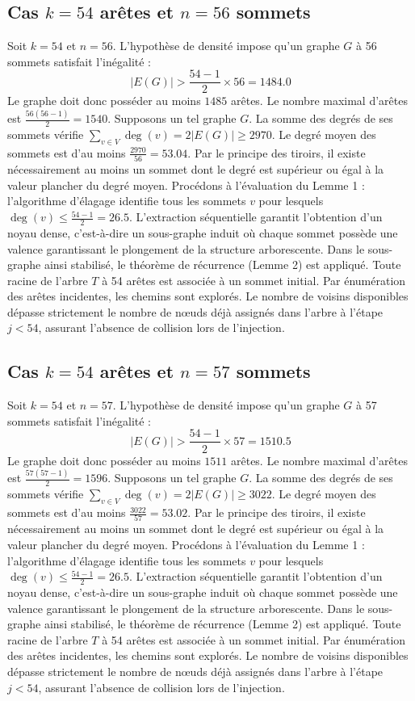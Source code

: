 \documentclass[12pt,a4paper]{article}
\begin{document}
\subsection{Cas $k = 54$ arêtes et $n = 56$ sommets}
Soit $k = 54$ et $n = 56$. L'hypothèse de densité impose qu'un graphe $G$ à 56 sommets satisfait l'inégalité :
$$ |E(G)| > \frac{54-1}{2} \times 56 = 1484.0 $$
Le graphe doit donc posséder au moins $1485$ arêtes. Le nombre maximal d'arêtes est $\frac{56(56-1)}{2} = 1540$.
Supposons un tel graphe $G$. La somme des degrés de ses sommets vérifie $\sum_{v \in V} \deg(v) = 2|E(G)| \geq 2970$.
Le degré moyen des sommets est d'au moins $\frac{2970}{56} = 53.04$.
Par le principe des tiroirs, il existe nécessairement au moins un sommet dont le degré est supérieur ou égal à la valeur plancher du degré moyen.
Procédons à l'évaluation du Lemme 1 : l'algorithme d'élagage identifie tous les sommets $v$ pour lesquels $\deg(v) \leq \frac{54-1}{2} = 26.5$.
L'extraction séquentielle garantit l'obtention d'un noyau dense, c'est-à-dire un sous-graphe induit où chaque sommet possède une valence garantissant le plongement de la structure arborescente.
Dans le sous-graphe ainsi stabilisé, le théorème de récurrence (Lemme 2) est appliqué. Toute racine de l'arbre $T$ à 54 arêtes est associée à un sommet initial. Par énumération des arêtes incidentes, les chemins sont explorés. Le nombre de voisins disponibles dépasse strictement le nombre de nœuds déjà assignés dans l'arbre à l'étape $j < 54$, assurant l'absence de collision lors de l'injection.

\subsection{Cas $k = 54$ arêtes et $n = 57$ sommets}
Soit $k = 54$ et $n = 57$. L'hypothèse de densité impose qu'un graphe $G$ à 57 sommets satisfait l'inégalité :
$$ |E(G)| > \frac{54-1}{2} \times 57 = 1510.5 $$
Le graphe doit donc posséder au moins $1511$ arêtes. Le nombre maximal d'arêtes est $\frac{57(57-1)}{2} = 1596$.
Supposons un tel graphe $G$. La somme des degrés de ses sommets vérifie $\sum_{v \in V} \deg(v) = 2|E(G)| \geq 3022$.
Le degré moyen des sommets est d'au moins $\frac{3022}{57} = 53.02$.
Par le principe des tiroirs, il existe nécessairement au moins un sommet dont le degré est supérieur ou égal à la valeur plancher du degré moyen.
Procédons à l'évaluation du Lemme 1 : l'algorithme d'élagage identifie tous les sommets $v$ pour lesquels $\deg(v) \leq \frac{54-1}{2} = 26.5$.
L'extraction séquentielle garantit l'obtention d'un noyau dense, c'est-à-dire un sous-graphe induit où chaque sommet possède une valence garantissant le plongement de la structure arborescente.
Dans le sous-graphe ainsi stabilisé, le théorème de récurrence (Lemme 2) est appliqué. Toute racine de l'arbre $T$ à 54 arêtes est associée à un sommet initial. Par énumération des arêtes incidentes, les chemins sont explorés. Le nombre de voisins disponibles dépasse strictement le nombre de nœuds déjà assignés dans l'arbre à l'étape $j < 54$, assurant l'absence de collision lors de l'injection.
\end{document}
